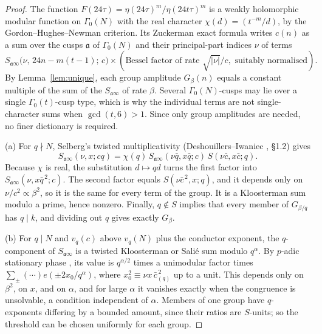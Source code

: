 \documentclass[11pt]{amsart}
\begin{document}
\begin{proof}
The function $F(24\tau)=\eta(24\tau)^m/\eta(24t\tau)^m$ is a weakly holomorphic modular function on $\Gamma_0(N)$ with the real character $\chi(d)=(t^{-m}/d)$, by the Gordon--Hughes--Newman criterion. Its Zuckerman exact formula writes $c(n)$ as a sum over the cusps $\mathfrak a$ of $\Gamma_0(N)$ and their principal-part indices $\nu$ of terms
\[
S_{\mathfrak a\infty}\big(\nu,\,24n-m(t-1);\,c\big)\times(\text{Bessel factor of rate }\sqrt{|\nu|}/c,\text{ suitably normalised}).
\]
By Lemma~\ref{lem:unique}, each group amplitude $G_\beta(n)$ equals a constant multiple of the sum of the $S_{\mathfrak a\infty}$ of rate $\beta$. Several $\Gamma_0(N)$-cusps may lie over a single $\Gamma_0(t)$-cusp type, which is why the individual terms are not single-character sums when $\gcd(t,6)>1$. Since only group amplitudes are needed, no finer dictionary is required.

(a) For $q\nmid N$, Selberg's twisted multiplicativity (Deshouillers--Iwaniec \cite{DI}, \S1.2) gives
\[
S_{\mathfrak a\infty}(\nu,x;cq)=\chi(q)\,S_{\mathfrak a\infty}(\nu\bar q,x\bar q;c)\,S(\nu\bar c,x\bar c;q).
\]
Because $\chi$ is real, the substitution $d\mapsto qd$ turns the first factor into $S_{\mathfrak a\infty}(\nu,x\bar q^{\,2};c)$. The second factor equals $S(\nu\bar c^{\,2},x;q)$, and it depends only on $\nu/c^2\propto\beta^2$, so it is the same for every term of the group. It is a Kloosterman sum modulo a prime, hence nonzero. Finally, $q\notin S$ implies that every member of $G_{\beta/q}$ has $q\mid k$, and dividing out $q$ gives exactly $G_\beta$.

(b) For $q\mid N$ and $v_q(c)$ above $v_q(N)$ plus the conductor exponent, the $q$-component of $S_{\mathfrak a\infty}$ is a twisted Kloosterman or Sali\'e sum modulo $q^\alpha$. By $p$-adic stationary phase \cite[\S12.3]{IK}, its value is $q^{\alpha/2}$ times a unimodular factor times $\sum_\pm(\cdots)e(\pm2x_0/q^\alpha)$, where $x_0^2\equiv\nu x\,\bar c_{(q)}^{\,2}$ up to a unit. This depends only on $\beta^2$, on $x$, and on $\alpha$, and for large $\alpha$ it vanishes exactly when the congruence is unsolvable, a condition independent of $\alpha$. Members of one group have $q$-exponents differing by a bounded amount, since their ratios are $S$-units; so the threshold can be chosen uniformly for each group.
\end{proof}
\end{document}
